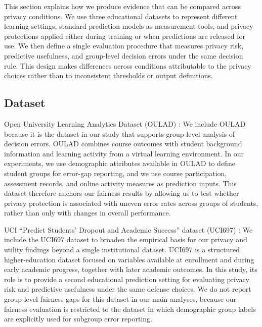 \documentclass{edm_article}
\begin{document}
This section explains how we produce evidence that can be compared across privacy conditions. We use three educational datasets to represent different learning settings, standard prediction models as measurement tools, and privacy protections applied either during training or when predictions are released for use. We then define a single evaluation procedure that measures privacy risk, predictive usefulness, and group-level decision errors under the same decision rule. This design makes differences across conditions attributable to the privacy choices rather than to inconsistent thresholds or output definitions.

\subsection{Dataset}

Open University Learning Analytics Dataset (OULAD) \cite{30oro53873}: We include OULAD because it is the dataset in our study that supports group-level analysis of decision errors. OULAD combines course outcomes with student background information and learning activity from a virtual learning environment. In our experiments, we use demographic attributes available in OULAD to define student groups for error-gap reporting, and we use course participation, assessment records, and online activity measures as prediction inputs. This dataset therefore anchors our fairness results by allowing us to test whether privacy protection is associated with uneven error rates across groups of students, rather than only with changes in overall performance.

UCI ``Predict Students' Dropout and Academic Success'' dataset (UCI697) \cite{31predict_students_dropout_academic_success_uci697}: We include the UCI697 dataset to broaden the empirical basis for our privacy and utility findings beyond a single institutional dataset. UCI697 is a structured higher-education dataset focused on variables available at enrollment and during early academic progress, together with later academic outcomes. In this study, its role is to provide a second educational prediction setting for evaluating privacy risk and predictive usefulness under the same defense choices. We do not report group-level fairness gaps for this dataset in our main analyses, because our fairness evaluation is restricted to the dataset in which demographic group labels are explicitly used for subgroup error reporting.
\end{document}
